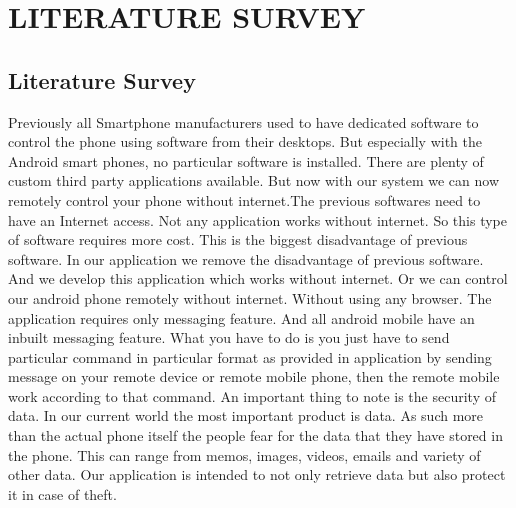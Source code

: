 

\chapter{LITERATURE SURVEY}

\section{Literature Survey}

\hspace{0.9cm} Previously all Smartphone manufacturers used to have dedicated software to control the phone using software from their desktops. But especially with the Android smart phones, no particular software is installed. There are plenty of custom third party applications available. But now with our system we can now remotely control your phone without internet.The previous softwares need to have an Internet access. Not any application works without internet. So this type of software requires more cost. This is the biggest disadvantage of previous software. In our application we remove the disadvantage of previous software. And we develop this application which works without internet. Or we can control our android phone remotely without internet. Without using any browser. The application requires only messaging feature. And all android mobile have an inbuilt messaging feature. What you have to do is you just have to send particular command in particular format as provided in application by sending message on your remote device or remote mobile phone, then the remote mobile work according to that command. An important thing to note is the security of data. In our current world the most important product is data. As such more than the actual phone itself the people fear for the data that they have stored in the phone. This can range from memos, images, videos, emails and variety of other data. Our application is intended to not only retrieve data but also protect it in case of theft. \cite{citation-2}

